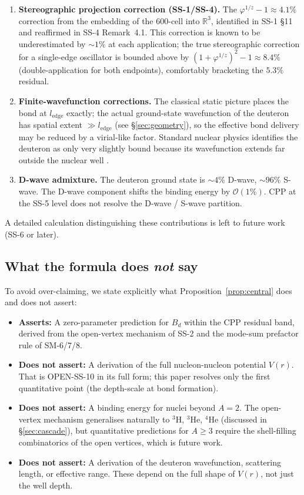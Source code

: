 \documentclass[11pt,letterpaper]{article}
\newcommand{\phig}{\varphi}
\newcommand{\ledge}{l_{\mathrm{edge}}}
\newcommand{\Bd}{B_{d}}
\begin{document}
\begin{enumerate}
\item \textbf{Stereographic projection correction (SS-1/SS-4).} The $\phig^{1/z} - 1 \approx 4.1\%$ correction from the embedding of the 600-cell into $\mathbb{R}^3$, identified in SS-1 \S11 and reaffirmed in SS-4 Remark~4.1. This correction is known to be underestimated by $\sim 1\%$ at each application; the true stereographic correction for a single-edge oscillator is bounded above by $(1+\phig^{1/z})^2 - 1 \approx 8.4\%$ (double-application for both endpoints), comfortably bracketing the $5.3\%$ residual.
\item \textbf{Finite-wavefunction corrections.} The classical static picture places the bond at $\ledge$ exactly; the actual ground-state wavefunction of the deuteron has spatial extent $\gg \ledge$ (see \S\ref{sec:geometry}), so the effective bond delivery may be reduced by a virial-like factor. Standard nuclear physics identifies the deuteron as only very slightly bound because its wavefunction extends far outside the nuclear well \citep{krane_nuclear}.
\item \textbf{D-wave admixture.} The deuteron ground state is $\sim 4\%$ D-wave, $\sim 96\%$ S-wave. The D-wave component shifts the binding energy by $\mathcal{O}(1\%)$. CPP at the SS-5 level does not resolve the D-wave / S-wave partition.
\end{enumerate}

A detailed calculation distinguishing these contributions is left to future work (SS-6 or later).

\subsection{What the formula does \emph{not} say}

To avoid over-claiming, we state explicitly what Proposition~\ref{prop:central} does and does not assert:

\begin{itemize}
\item \textbf{Asserts:} A zero-parameter prediction for $\Bd$ within the CPP residual band, derived from the open-vertex mechanism of SS-2 and the mode-sum prefactor rule of SM-6/7/8.
\item \textbf{Does not assert:} A derivation of the full nucleon-nucleon potential $V(r)$. That is OPEN-SS-10 in its full form; this paper resolves only the first quantitative point (the depth-scale at bond formation).
\item \textbf{Does not assert:} A binding energy for nuclei beyond $A = 2$. The open-vertex mechanism generalises naturally to ${}^{3}\mathrm{H}$, ${}^{3}\mathrm{He}$, ${}^{4}\mathrm{He}$ (discussed in \S\ref{sec:cascade}), but quantitative predictions for $A \geq 3$ require the shell-filling combinatorics of the open vertices, which is future work.
\item \textbf{Does not assert:} A derivation of the deuteron wavefunction, scattering length, or effective range. These depend on the full shape of $V(r)$, not just the well depth.
\end{itemize}
\end{document}
